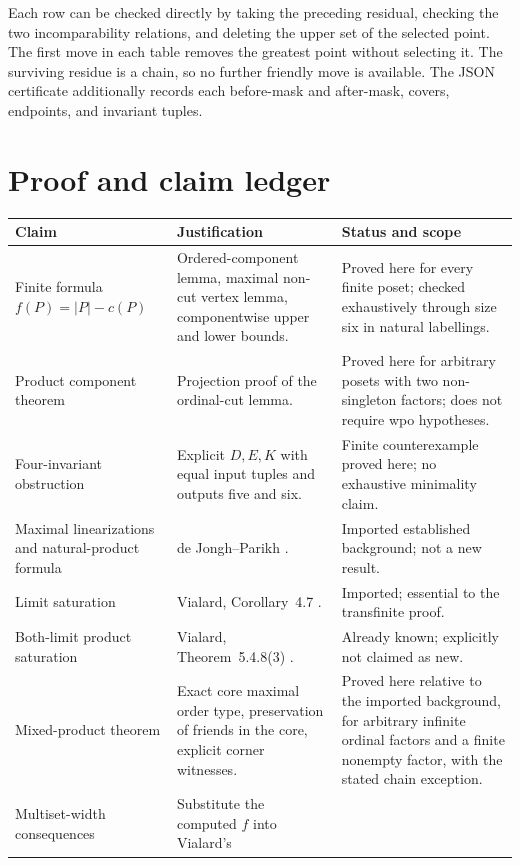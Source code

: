 \documentclass[11pt,letterpaper]{article}
\theoremstyle{definition}
\theoremstyle{remark}
\begin{document}
Each row can be checked directly by taking the preceding residual,
checking the two incomparability relations, and deleting the upper set of
the selected point. The first move in each table removes the greatest
point without selecting it. The surviving residue is a chain, so no
further friendly move is available. The JSON certificate additionally
records each before-mask and after-mask, covers, endpoints, and invariant
tuples.

\clearpage
\section{Proof and claim ledger}\label{app:ledger}

\small
\renewcommand{\arraystretch}{1.25}
\begin{longtable}{@{}p{}p{}p{}@{}}
\toprule
\textbf{Claim} & \textbf{Justification} & \textbf{Status and scope}\\
\midrule
\endhead
Finite formula $f(P)=|P|-c(P)$ & Ordered-component lemma, maximal non-cut
vertex lemma, componentwise upper and lower bounds. & Proved here for every
finite poset; checked exhaustively through size six in natural labellings.\\
Product component theorem & Projection proof of the ordinal-cut lemma. &
Proved here for arbitrary posets with two non-singleton factors; does not
require wpo hypotheses.\\
Four-invariant obstruction & Explicit $D,E,K$ with equal input tuples and
outputs five and six. & Finite counterexample proved here; no exhaustive
minimality claim.\\
Maximal linearizations and natural-product formula & de Jongh--Parikh
\cite{DeJonghParikh}. & Imported established background; not a new result.\\
Limit saturation & Vialard, Corollary~4.7 \cite{Vialard2023}. & Imported;
essential to the transfinite proof.\\
Both-limit product saturation & Vialard, Theorem~5.4.8(3)
\cite{VialardThesis}. & Already known; explicitly not claimed as new.\\
Mixed-product theorem & Exact core maximal order type, preservation of
friends in the core, explicit corner witnesses. & Proved here relative
to the imported background, for arbitrary infinite ordinal factors and a
finite nonempty factor, with the stated chain exception.\\
Multiset-width consequences & Substitute the computed $f$ into Vialard's

\end{longtable}
\end{document}
